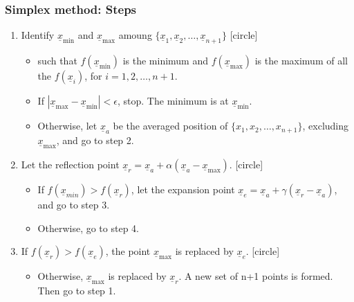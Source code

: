 \documentclass{beamer}
\begin{document}
\begin{frame}
    \frametitle{Simplex method: Steps}
    \begin{enumerate}
        \item Identify $\underline{x}_{\min}$ and $\underline{x}_{\max}$ amoung
            $\{\underline{x}_1, \underline{x}_2,\dots,\underline{x}_{n+1}\}$
            [circle]
            \begin{itemize}
                \item such that $f(\underline{x}_{\min})$ is the minimum
                and $f(\underline{x}_{\max})$ is the maximum
                of all the $f(\underline{x}_i)$, for $i=1, 2, \dots,n+1$.
                \item If $|\underline{x}_{\max}-\underline{x}_{\min}|<\epsilon$, stop.
                The minimum is at $\underline{x}_{\min}$.
                \item Otherwise, let $\underline{x}_a$ be the averaged position of $\{x_1, x_2, \dots, x_{n+1}\}$,
                excluding $\underline{x}_{\max}$, and go to step 2.
            \end{itemize}
        \item Let the reflection point $\underline{x}_r=\underline{x}_a+\alpha (\underline{x}_a-\underline{x}_{\max})$.
        [circle]
        \begin{itemize}
            \item If $f(\underline{x}_{min})>f(\underline{x}_{r})$, let the expansion point $\underline{x}_e=\underline{x}_a+\gamma (\underline{x}_r-\underline{x}_a)$,
            and go to step 3.
            \item Otherwise, go to step 4.
        \end{itemize}
        \item If $f(\underline{x}_r)>f(\underline{x}_e)$, the point $\underline{x}_{\max}$ is replaced by $\underline{x}_e$.
        [circle]
        \begin{itemize}
            \item Otherwise, $\underline{x}_{\max}$ is replaced by $\underline{x}_r$.
            A new set of n+1 points is formed. Then go to step 1.
        \end{itemize}
    \end{enumerate}
\end{frame}
\end{document}

